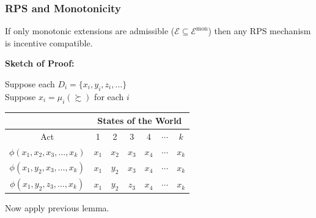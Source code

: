 
\begin{frame}
  \frametitle{RPS and Monotonicity}

\begin{proposition}
If only monotonic extensions are admissible ($\mathcal{E}\subseteq \mathcal{E}^\mathrm{mon}$) then any RPS mechanism is incentive compatible.
\end{proposition}

\bigskip

\textbf{Sketch of Proof:}

\smallskip

  Suppose each $D_i = \{x_i,y_i,z_i,\ldots\}$\\
  Suppose $x_i = \mu_i(\succsim)$ for each $i$

  \begin{center}
    \begin{tabular}{|c||c|c|c|c|c|c|}
      \hline
                & \multicolumn{6}{|c|}{States of the World} \\ \hline
      Act   & 1     & 2     & 3     & 4     & $\cdots$     & $k$     \\ \hline\hline
      $\phi(x_1,x_2,x_3,\ldots,x_k)$ & $x_1$ & $x_2$ & $x_3$ & $x_4$ & $\cdots$ & $x_k$ \\ \hline
      $\phi(x_1,y_2,x_3,\ldots,x_k)$ & $x_1$ & $y_2$ & $x_3$ & $x_4$ & $\cdots$ & $x_k$ \\ \hline
      $\phi(x_1,y_2,z_3,\ldots,x_k)$ & $x_1$ & $y_2$ & $z_3$ & $x_4$ & $\cdots$ & $x_k$ \\ \hline
    \end{tabular}
  \end{center}

  Now apply previous lemma.

\end{frame}


%
%
%

